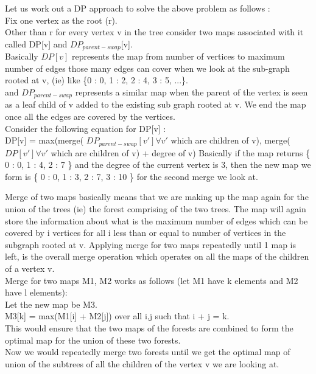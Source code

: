 \documentclass[solution,addpoints,12pt]{exam}
\begin{document}
\begin{questions}
\begin{parts}
Let us work out a DP approach to solve the above problem as follows :\\
Fix one vertex as the root (r).\\
Other than r for every vertex v in the tree consider two maps associated
with it called DP[v] and $DP_{parent-swap}$[v].\\
Basically $DP[v]$ represents the map from number of vertices to maximum number of edges
those many edges can cover when we look at the
sub-graph rooted at v, (ie) like \{0 : 0, 1 : 2, 2 : 4, 3 : 5, ...\}.\\
and $DP_{parent-swap}$ represents a similar map when the parent of the vertex
is seen as a leaf child of v added to the existing sub graph rooted at v.
We end the map once all the edges are covered by the vertices.
\\


Consider the following equation for DP[v] :\\
DP[v] = max(merge(
$DP_{parent-swap}[v'] \forall v'$ which are children of v),
merge($DP[v'] \forall v'$ which are children of v) + degree of v)
Basically if the map returns \{ 0 : 0, 1 : 4, 2 : 7 \} and the
degree of the current vertex is 3, then the
new map we form is \{ 0 : 0, 1 : 3, 2 : 7, 3 : 10 \} for the second merge we look at.

Merge of two maps basically means that we are making up the
map again for the union of the trees (ie) the forest comprising of the two trees.
The map will again store the information about what is the maximum number of edges
which can be covered by i vertices for all i less than or equal to number of vertices
in the subgraph rooted at v.
Applying merge for two maps repeatedly until 1 map is left, is the overall merge operation
which operates on all the maps of the children of a vertex v.\\

Merge for two maps M1, M2 works as follows (let M1 have k elements and M2 have l elements):\\
Let the new map be M3.\\
M3[k] = max(M1[i] + M2[j]) over all i,j such that i + j = k.\\
This would ensure that the two maps of the forests are combined to form the optimal map
for the union of these two forests.\\
Now we would repeatedly merge two forests until we get the optimal map of
union of the subtrees of all the children of the vertex v we are looking at.\\


\end{parts}
\end{questions}
\end{document}

